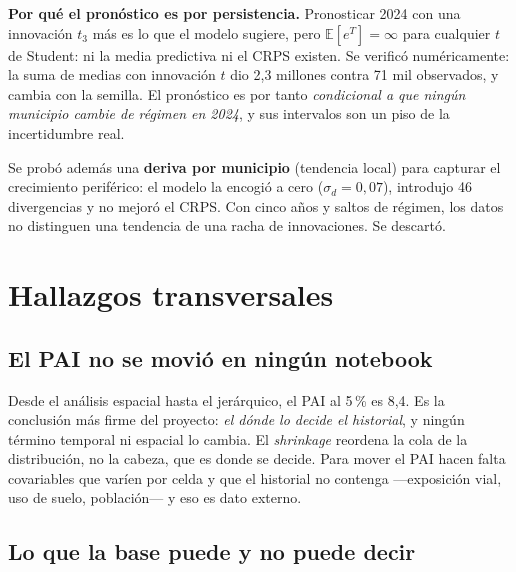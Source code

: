 \documentclass[11pt,a4paper]{article}
\newcommand{\E}{\mathbb{E}}
\begin{document}
\begin{advertencia}
\textbf{Por qué el pronóstico es por persistencia.} Pronosticar 2024 con una
innovación $t_3$ más es lo que el modelo sugiere, pero $\E[e^{T}] = \infty$
para cualquier $t$ de Student: ni la media predictiva ni el CRPS existen. Se
verificó numéricamente: la suma de medias con innovación $t$ dio 2,3 millones
contra 71 mil observados, y cambia con la semilla. El pronóstico es por tanto
\emph{condicional a que ningún municipio cambie de régimen en 2024}, y sus
intervalos son un piso de la incertidumbre real.
\end{advertencia}

Se probó además una \textbf{deriva por municipio} (tendencia local) para
capturar el crecimiento periférico: el modelo la encogió a cero
($\sigma_d = 0{,}07$), introdujo 46 divergencias y no mejoró el CRPS. Con cinco
años y saltos de régimen, los datos no distinguen una tendencia de una racha
de innovaciones. Se descartó.

\section{Hallazgos transversales}

\subsection{El PAI no se movió en ningún notebook}

Desde el análisis espacial hasta el jerárquico, el PAI al 5\,\% es 8,4. Es la
conclusión más firme del proyecto: \emph{el dónde lo decide el historial}, y
ningún término temporal ni espacial lo cambia. El \emph{shrinkage} reordena la
cola de la distribución, no la cabeza, que es donde se decide. Para mover el
PAI hacen falta covariables que varíen por celda y que el historial no
contenga —exposición vial, uso de suelo, población— y eso es dato externo.

\subsection{Lo que la base puede y no puede decir}
\end{document}
